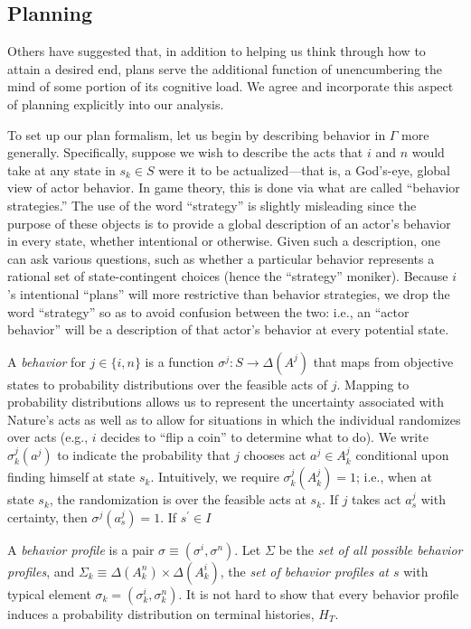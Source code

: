 \documentclass[
11pt,
titlepage,
reqno,
]{article}%
\theoremstyle{definition}
\begin{document}
\subsection{Planning}
Others have suggested that, in addition to helping us think through how to attain a desired end, plans serve the additional function of unencumbering the mind of some portion of its cognitive load. 
We agree and incorporate this aspect of planning explicitly into our analysis.

To set up our plan formalism, let us begin by describing behavior in $\Gamma$ more generally. 
Specifically, suppose we wish to describe the acts that $i$ and $n$ would take at any state in $s_k\in S$ were it to be actualized---that is, a God's-eye, global view of actor behavior. 
In game theory, this is done via what are called ``behavior strategies.''
The use of the word ``strategy'' is slightly misleading since the purpose of these objects is to provide a global description of an actor's behavior in every state, whether intentional or otherwise.
Given such a description, one can ask various questions, such as whether a particular behavior represents a rational set of state-contingent choices (hence the ``strategy'' moniker).
Because $i$'s intentional ``plans'' will more restrictive than behavior strategies, we drop the word ``strategy'' so as to avoid confusion between the two: i.e., an ``actor behavior'' will be a description of that actor's behavior at every potential state.

A \textit{behavior} for $j\in\{i,n\}$ is a function $\sigma^j:S\rightarrow \Delta(A^j)$ that maps from objective states  to probability distributions over the feasible acts of $j$.
Mapping to probability distributions allows us to represent the uncertainty associated with Nature's acts as well as to allow for situations in which the individual randomizes over acts (e.g., $i$ decides to ``flip a coin'' to determine what to do).
We write $\sigma^j_k(a^j)$ to indicate the probability that $j$ chooses act $a^j\in A^j_k$ conditional upon finding himself at state $s_k$.
Intuitively, we require $\sigma^j_k(A^j_k)=1$; i.e., when at state $s_k$, the randomization is over the feasible acts at $s_k$.
If $j$ takes act $a^j_s$ with certainty, then $\sigma^j(a^j_s) =1$. 
If $s^\prime\in I$

A \textit{behavior profile} is a pair $\sigma\equiv(\sigma^i,\sigma^n)$.
Let $\Sigma$ be the \textit{set of all possible behavior profiles}, and $\Sigma_k\equiv \Delta(A^n_{k})\times\Delta(A^i_{k})$, the \textit{set of behavior profiles at $s$} with typical element $\sigma_k=(\sigma^i_k,\sigma^n_k)$.
It is not hard to show that every behavior profile induces a probability distribution on terminal histories, $H_T$.
\end{document}
